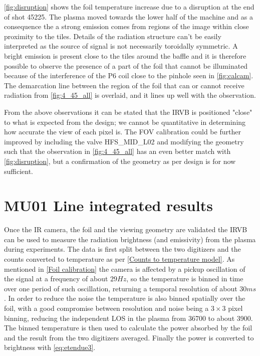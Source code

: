 \autoref{fig:disruption} shows the foil temperature increase due to a disruption at the end of shot 45225. The plasma moved towards the lower half of the machine and as a consequence the a strong emission comes from regions of the image within close proximity to the tiles. Details of the radiation structure can't be easily interpreted as the source of signal is not necessarily toroidally symmetric. A bright emission is present close to the tiles around the baffle and it is therefore possible to observe the presence of a part of the foil that cannot be illuminated because of the interference of the P6 coil close to the pinhole seen in \autoref{fig:calcam}. The demarcation line between the region of the foil that can or cannot receive radiation from \autoref{fig:4_45_all} is overlaid, and it lines up well with the observation.

From the above observations it can be stated that the IRVB is positioned "close" to what is expected from the design; we cannot be quantitative in determining how accurate the view of each pixel is. The FOV calibration could be further improved by including the valve HFS\_MID\_L02 and modifying the geometry such that the observation in \autoref{fig:4_45_all} has an even better match with \autoref{fig:disruption}, but a confirmation of the geometry as per design is for now sufficient.


\section{MU01 Line integrated results}\label{MU01 Line integrated results}

Once the IR camera, the foil and the viewing geometry are validated the IRVB can be used to measure the radiation brightness (and emissivity) from the plasma during experiments. The data is first split between the two digitizers and the counts converted to temperature as per \autoref{Counts to temperature model}. As mentioned in \autoref{Foil calibration} the camera is affected by a pickup oscillation of the signal at a frequency of about $29Hz$, so the temperature is binned in time over one period of such oscillation, returning a temporal resolution of about $30ms$. In order to reduce the noise the temperature is also binned spatially over the foil, with a good compromise between resolution and noise being a $3\times3$ pixel binning, reducing the independent LOS in the plasma from 36700 to about 3900. The binned temperature is then used to calculate the power absorbed by the foil and the result from the two digitizers averaged. Finally the power is converted to brightness with \autoref{eq:etendue3}. %


